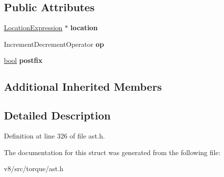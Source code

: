 \subsection*{Public Attributes}
\begin{DoxyCompactItemize}
\item 
\mbox{\label{structv8_1_1internal_1_1torque_1_1IncrementDecrementExpression_abd6fa0e428640e4377ed08872711c09b}} 
\mbox{\hyperlink{structv8_1_1internal_1_1torque_1_1LocationExpression}{Location\+Expression}} $\ast$ {\bfseries location}
\item 
\mbox{\label{structv8_1_1internal_1_1torque_1_1IncrementDecrementExpression_aa448f6bbbbf1b2d8d9ba9a4f9b5e8670}} 
Increment\+Decrement\+Operator {\bfseries op}
\item 
\mbox{\label{structv8_1_1internal_1_1torque_1_1IncrementDecrementExpression_a84d1fc73deb41f9deb2d0cfe281d81f0}} 
\mbox{\hyperlink{classbool}{bool}} {\bfseries postfix}
\end{DoxyCompactItemize}
\subsection*{Additional Inherited Members}


\subsection{Detailed Description}


Definition at line 326 of file ast.\+h.



The documentation for this struct was generated from the following file\+:\begin{DoxyCompactItemize}
\item 
v8/src/torque/ast.\+h\end{DoxyCompactItemize}
